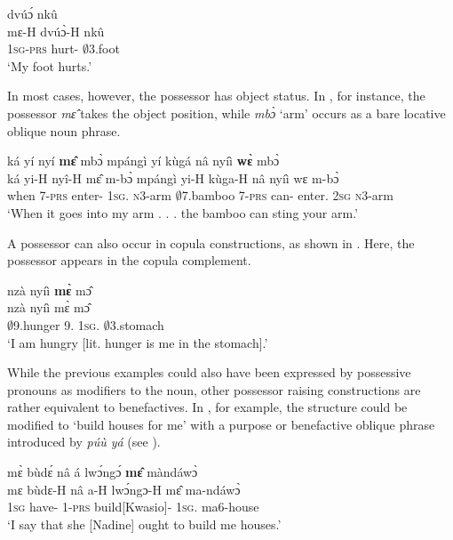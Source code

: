 \ea \label{PR1}
   dvúɔ́ nkû \\
          mɛ-H dvúɔ̀-H nkû \\
           1\textsc{sg}-\textsc{prs} hurt-{\R} $\emptyset$3.foot\\
    \trans `My foot hurts.'
\z

In most cases, however, the possessor has object status. In , for instance, the possessor {\itshape mɛ̂} takes the object position, while {\itshape mbɔ̀} `arm' occurs as a bare locative oblique noun phrase.

\ea \label{PR2}
  \glll    ká yí nyí {\bfseries mɛ̂} mbɔ̀ mpángì yí kùgá nâ nyíì {\bfseries wɛ̀} mbɔ̀ \\
           ká yi-H nyî-H mɛ̂ m-bɔ̀ mpángì yi-H kùga-H nâ nyíì wɛ m-bɔ̀ \\
             when 7-\textsc{prs} enter-{\R} 1\textsc{sg}.{\OBJ} \textsc{n}3-arm $\emptyset$7.bamboo 7-\textsc{prs} can-{\R} {\COMP} enter.{\SBJV} 2\textsc{sg} \textsc{n}3-arm\\
    \trans `When it goes into my arm . . . the bamboo can sting your arm.'
\z

A possessor can also occur in copula constructions, as shown in . Here, the possessor appears in the copula complement.

\ea \label{PR3}
  \glll  nzà nyíì {\bfseries mɛ̀} mɔ̂ \\
          nzà nyíì mɛ̀ mɔ̂ \\
           $\emptyset$9.hunger 9.{\COP} 1\textsc{sg}.{\OBJ} $\emptyset$3.stomach\\
    \trans `I am hungry [lit. hunger is me in the stomach].'
\z

While the previous examples could also have been expressed by possessive pronouns as modifiers to the noun, other possessor raising constructions are rather equivalent to benefactives. In , for example, the structure could be modified to `build houses for me' with a purpose or benefactive oblique phrase introduced by {\itshape púù yá} (see ).

\ea \label{PR4}
  \glll mɛ̀ bùdɛ́ nâ á lwɔ́ngɔ́ {\bfseries mɛ̂} màndáwɔ̀\\
        mɛ bùdɛ-H nâ a-H lwɔ́ngɔ-H mɛ̂ ma-ndáwɔ̀ \\
       1\textsc{sg} have-{\R} {\COMP} 1-\textsc{prs} build[Kwasio]-{\R} 1\textsc{sg}.{\OBJ} ma6-house\\
    \trans `I say that she [Nadine] ought to build me houses.'
\z


